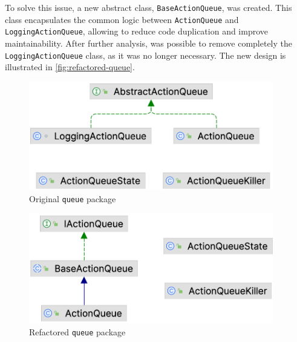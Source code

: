 To solve this issue, a new abstract class, \texttt{BaseActionQueue}, was created. This class encapsulates the common logic between \texttt{ActionQueue} and \texttt{LoggingActionQueue}, allowing to reduce code duplication and improve maintainability. After further analysis, was possible to remove completely the \texttt{LoggingActionQueue} class, as it was no longer necessary. The new design is illustrated in \autoref{fig:refactored-queue}.

\begin{minipage}{0.5\linewidth}
	\begin{figure}[H]
		\begin{center}
			\includegraphics[width=0.95\textwidth]{figures/queue_package/original.png}
			\caption{Original \texttt{queue} package}
			\label{fig:original-queue}
		\end{center}
	\end{figure}
\end{minipage}
\begin{minipage}{0.5\linewidth}
	\begin{figure}[H]
		\begin{center}
			\includegraphics[width=0.95\textwidth]{figures/queue_package/refactored.png}
			\caption{Refactored \texttt{queue} package}
			\label{fig:refactored-queue}
		\end{center}
	\end{figure}
\end{minipage}
